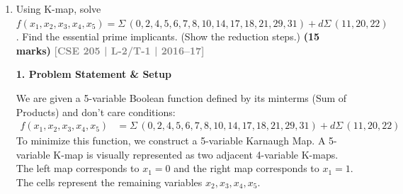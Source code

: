 \documentclass[12pt,a3paper]{article}
\newcommand{\yr}[1]{\hfill\textcolor{gray}{\small\textbf{[#1]}}}
\newcommand{\mk}[1]{\textcolor{orange!70!black}{\small\textbf{(#1 marks)}}}
\begin{document}
\begin{enumerate}
\begin{tcolorbox}[enhanced,breakable,ansbox,colback=cC!4,colframe=cC,boxrule=0.8pt,arc=5pt,title={\textbf{Answer}},fonttitle=\bfseries\color{white},colbacktitle=cC]
\vspace{0.3cm}
\textbf{4. Minimal Sum-of-Products (SOP) Expression} \\
To find the final minimized expression, we must first include all Essential Prime Implicants, which cover minterms $m_1, m_7$, and $m_9$ (since $m_9$ is absorbed by $x'y'$). 

The remaining uncovered minterms are $m_2, m_4, m_{10}, m_{12},$ and $m_{14}$. 
Looking at our list of available PIs, we want to select the minimum number of implicants to cover these five minterms:
\begin{itemize}
    \item Selecting $yz'$ covers $m_2, m_{10},$ and $m_{14}$.
    \item Selecting $xz'$ covers $m_4, m_{12},$ and $m_{14}$.
\end{itemize}
These two PIs together perfectly cover all of the remaining minterms. Adding them to our EPIs yields the optimal and complete sum-of-products equation.

\begin{align*}
    f(w,x,y,z) &= \text{EPIs} + \text{Remaining Minimal Cover} \\
    f(w,x,y,z) &= \textcolor{cC}{\mathbf{x'y' + w'xy + xz' + yz'}}
\end{align*}

\end{tcolorbox}

\item Using K-map, solve $f(x_1,x_2,x_3,x_4,x_5) = \Sigma\,(0,2,4,5,6,7,8,10,14,17,18,21,29,31) + d\Sigma\,(11,20,22)$. Find the essential prime implicants. (Show the reduction steps.)
\mk{15} \yr{CSE 205 | L-2/T-1 | 2016--17}

\begin{tcolorbox}[enhanced,breakable,ansbox,colback=cC!4,colframe=cC,boxrule=0.8pt,arc=5pt,title={\textbf{Answer}},fonttitle=\bfseries\color{white},colbacktitle=cC]

\textbf{1. Problem Statement \& Setup}

We are given a 5-variable Boolean function defined by its minterms (Sum of Products) and don't care conditions:
\begin{align*}
    f(x_1,x_2,x_3,x_4,x_5) &= \Sigma\,(0,2,4,5,6,7,8,10,14,17,18,21,29,31) + d\Sigma\,(11,20,22)
\end{align*}
To minimize this function, we construct a 5-variable Karnaugh Map. A 5-variable K-map is visually represented as two adjacent 4-variable K-maps. The left map corresponds to $x_1 = 0$ and the right map corresponds to $x_1 = 1$. The cells represent the remaining variables $x_2, x_3, x_4, x_5$.


\end{tcolorbox}
\end{enumerate}
\end{document}
